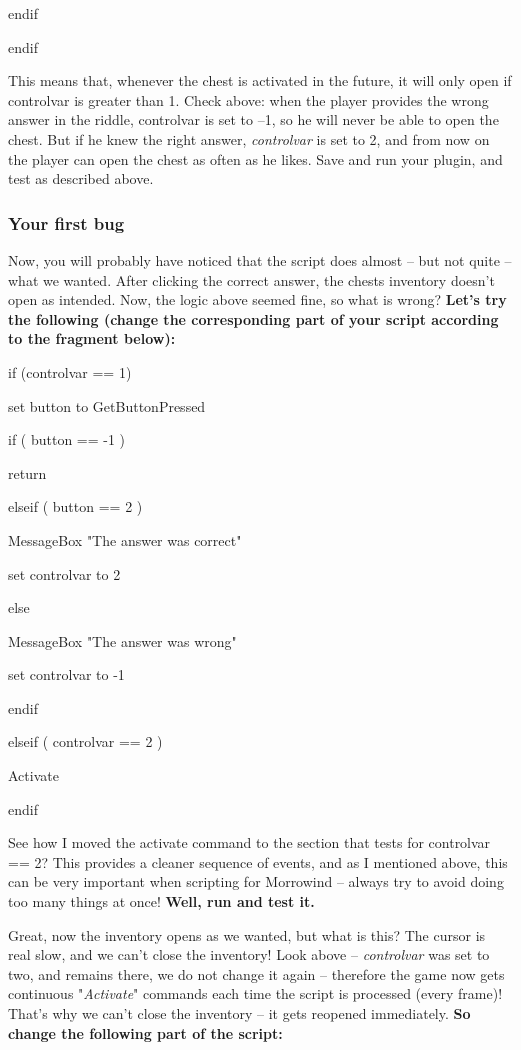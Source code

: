 endif

endif

This means that, whenever the chest is activated in the future, it will only open if controlvar is greater than 1. Check above: when the player provides the wrong answer in the riddle, controlvar is set to --1, so he will never be able to open the chest. But if he knew the right answer, \emph{controlvar} is set to 2, and from now on the player can open the chest as often as he likes. Save and run your plugin, and test as described above.

\hypertarget{your-first-bug}{%
\subsubsection{Your first bug}\label{your-first-bug}}

Now, you will probably have noticed that the script does almost -- but not quite -- what we wanted. After clicking the correct answer, the chests inventory doesn't open as intended. Now, the logic above seemed fine, so what is wrong? \textbf{Let's try the following (change the corresponding part of your script according to the fragment below):}


if (controlvar == 1)

set button to GetButtonPressed

if ( button == -1 )

return

elseif ( button == 2 )

MessageBox "The answer was correct"

set controlvar to 2

else

MessageBox "The answer was wrong"

set controlvar to -1

endif

elseif ( controlvar == 2 )

Activate

endif

See how I moved the activate command to the section that tests for controlvar == 2? This provides a cleaner sequence of events, and as I mentioned above, this can be very important when scripting for Morrowind -- always try to avoid doing too many things at once! \textbf{Well, run and test it.}

Great, now the inventory opens as we wanted, but what is this? The cursor is real slow, and we can't close the inventory! Look above -- \emph{controlvar} was set to two, and remains there, we do not change it again -- therefore the game now gets continuous "\emph{Activate}" commands each time the script is processed (every frame)! That's why we can't close the inventory -- it gets reopened immediately. \textbf{So change the following part of the script:}

